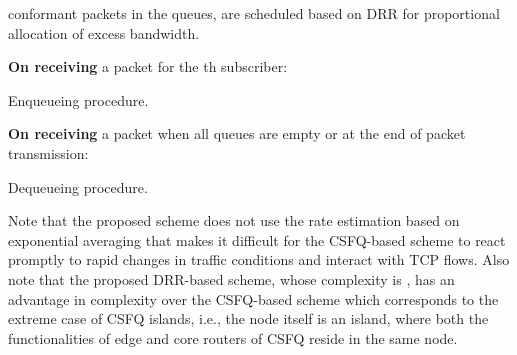 \documentclass[conference,twoside,final]{IEEEtran}
\begin{document}
conformant packets in the queues, are scheduled based on DRR for proportional
allocation of excess bandwidth.
\SetStartEndCondition{ }{}{}\AlgoDontDisplayBlockMarkers\SetAlgoNoEnd\SetAlgoNoLine \DontPrintSemicolon {}\SetAlFnt{\small}\begin{algorithm}[!t]
  \textbf{On receiving} a packet  for the th subscriber:\;
  \;
  \;
  {
    {
      \;
    }
  }
  \caption{Enqueueing procedure.}
  \label{alg:enqueueing}
\end{algorithm}
\begin{algorithm}[!htb]
  \textbf{On receiving} a packet when all queues are empty or at
  the end of packet transmission:\;
  \caption{Dequeueing procedure.}
  \label{alg:dequeueing}
\end{algorithm}

Note that the proposed scheme does not use the rate estimation based on
exponential averaging that makes it difficult for the CSFQ-based scheme to react
promptly to rapid changes in traffic conditions and interact with TCP
flows. Also note that the proposed DRR-based scheme, whose complexity is
, has an advantage in complexity over the CSFQ-based scheme
which corresponds to the extreme case of CSFQ islands, i.e., the node itself is
an island, where both the functionalities of edge and core routers of CSFQ
reside in the same node.
\end{document}
